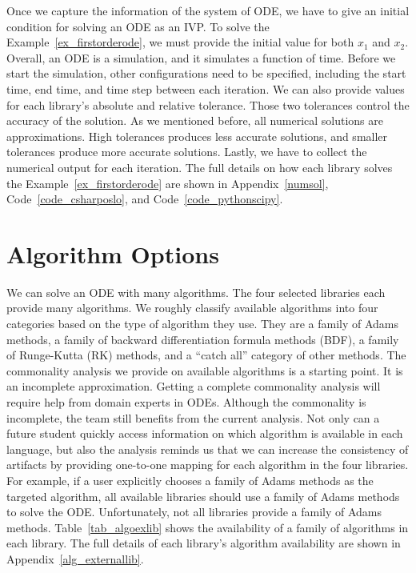 Once we capture the information of the system of ODE, we have to give an initial condition for solving an ODE as an IVP. To solve the Example~\ref{ex_firstorderode}, we must provide the initial value for both $x_1$ and $x_2$. Overall, an ODE is a simulation, and it simulates a function of time. Before we start the simulation, other configurations need to be specified, including the start time, end time, and time step between each iteration. We can also provide values for each library's absolute and relative tolerance. Those two tolerances control the accuracy of the solution. As we mentioned before, all numerical solutions are approximations. High tolerances produces less accurate solutions, and smaller tolerances produce more accurate solutions. Lastly, we have to collect the numerical output for each iteration. The full details on how each library solves the Example~\ref{ex_firstorderode} are shown in Appendix~\ref{numsol}, Code~\ref{code_csharposlo}, and Code~\ref{code_pythonscipy}.

\section{Algorithm Options}
We can solve an ODE with many algorithms. The four selected libraries each provide many algorithms. We roughly classify available algorithms into four categories based on the type of algorithm they use. They are a family of Adams methods, a family of backward differentiation formula methods (BDF), a family of Runge-Kutta (RK) methods, and a ``catch all'' category of other methods. The commonality analysis we provide on available algorithms is a starting point. It is an incomplete approximation. Getting a complete commonality analysis will require help from domain experts in ODEs. Although the commonality is incomplete, the team still benefits from the current analysis. Not only can a future student quickly access information on which algorithm is available in each language, but also the analysis reminds us that we can increase the consistency of artifacts by providing one-to-one mapping for each algorithm in the four libraries. For example, if a user explicitly chooses a family of Adams methods as the targeted algorithm, all available libraries should use a family of Adams methods to solve the ODE. Unfortunately, not all libraries provide a family of Adams methods. Table~\ref{tab_algoexlib} shows the availability of a family of algorithms in each library. The full details of each library's algorithm availability are shown in Appendix~\ref{alg_externallib}.

